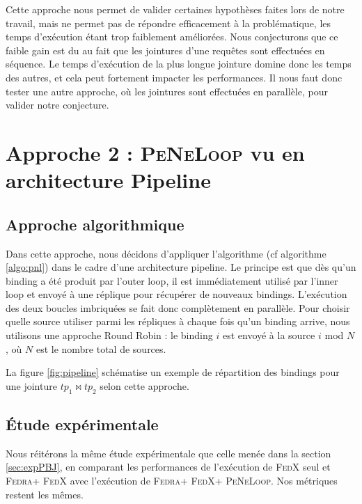 \documentclass[a4paper]{article}
\def\fedra{\textsc{Fedra}\xspace}
\def\fedx{\textsc{FedX}\xspace}
\def\peneloop{\textsc{PeNeLoop}\xspace}
\begin{document}
Cette approche nous permet de valider certaines hypothèses faites lors de notre travail, mais ne permet pas de répondre efficacement à la problématique, les temps d'exécution étant trop faiblement améliorées. Nous conjecturons que ce faible gain est du au fait que les jointures d'une requêtes sont effectuées en séquence. Le temps d'exécution de la plus longue jointure domine donc les temps des autres, et cela peut fortement impacter les performances. Il nous faut donc tester une autre approche, où les jointures sont effectuées en parallèle, pour valider notre conjecture.

\section{Approche 2 : \peneloop vu en architecture Pipeline}

\subsection{Approche algorithmique}

Dans cette approche, nous décidons d'appliquer l'algorithme (cf algorithme \ref{algo:pnl}) dans le cadre d'une architecture pipeline. Le principe est que dès qu'un binding a été produit par l'outer loop, il est immédiatement utilisé par l'inner loop et envoyé à une réplique pour récupérer de nouveaux bindings. L'exécution des deux boucles imbriquées se fait donc complètement en parallèle. Pour choisir quelle source utiliser parmi les répliques à chaque fois qu'un binding arrive, nous utilisons une approche Round Robin : le binding $i$ est envoyé à la source $i$ mod $N$, où $N$ est le nombre total de sources.

La figure \ref{fig:pipeline} schématise un exemple de répartition des bindings pour une jointure $tp_1 \bowtie tp_2$ selon cette approche.





\subsection{Étude expérimentale}

Nous réitérons la même étude expérimentale que celle menée dans la section \ref{sec:expPBJ}, en comparant les performances de l'exécution de \fedx seul et \fedra + \fedx avec l'exécution de \fedra + \fedx + \peneloop. Nos métriques restent les mêmes.
\end{document}
